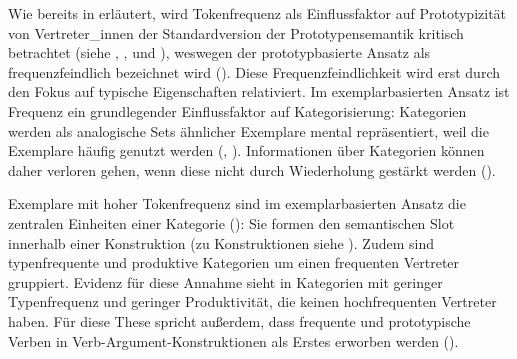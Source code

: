 Wie bereits in  erläutert, wird Tokenfrequenz als Einflussfaktor auf Prototypizität von Vertreter\_innen der Standardversion der Prototypensemantik kritisch betrachtet (siehe \cite[42]{Kleiber.1993}, \cite[52]{Taylor.1995}, \cite[50]{Schmid.2000} und \cite[567--568]{Taylor.2015}), weswegen der prototypbasierte Ansatz als frequenzfeindlich bezeichnet wird (\cite[365]{FenkOczlon.1991}). Diese Frequenzfeindlichkeit wird erst durch den Fokus auf typische Eigenschaften relativiert. Im exemplarbasierten Ansatz ist Frequenz ein grundlegender Einflussfaktor auf Kategorisierung: Kategorien werden als analogische Sets ähnlicher Exemplare mental repräsentiert, weil die Exemplare häufig genutzt werden (\cite[326]{Bybee.2006}, \cite[13]{Diessel.2017}). Informationen über Kategorien können daher verloren gehen, wenn diese nicht durch Wiederholung gestärkt werden (\cite[54]{Bybee.2013}). 


\begin{sloppypar}
Exemplare mit hoher Tokenfrequenz sind im exemplarbasierten Ansatz die zentralen Einheiten einer Kategorie (\cite[61]{Bybee.2013}): Sie formen den semantischen Slot innerhalb einer Konstruktion (zu Konstruktionen siehe ). Zudem sind typenfrequente und produktive Kategorien um einen frequenten Vertreter gruppiert. Evidenz für diese Annahme sieht \textcite[727]{Bybee.2006b} in Kategorien mit geringer Typenfrequenz und geringer Produktivität, die keinen hochfrequenten Vertreter haben. Für diese These spricht außerdem, dass frequente und prototypische Verben in Verb-Argument-Konstruktionen als Erstes erworben werden (\cite[5]{Ellis.2013}). 
\end{sloppypar}


